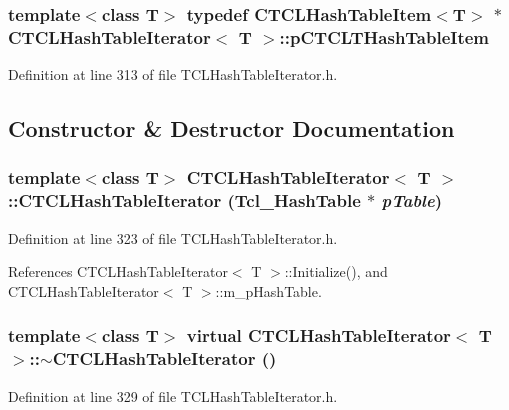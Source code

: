 \subsubsection{\setlength{\rightskip}{0pt plus 5cm}template$<$class T$>$ typedef {\bf CTCLHash\-Table\-Item}$<$T$>$ $\ast$ CTCLHash\-Table\-Iterator$<$ T $>$::p\-CTCLTHash\-Table\-Item\hspace{0.3cm}{\tt  [private]}}\label{classCTCLHashTableIterator_u1}




Definition at line 313 of file TCLHash\-Table\-Iterator.h.

\subsection{Constructor \& Destructor Documentation}
\subsubsection{\setlength{\rightskip}{0pt plus 5cm}template$<$class T$>$ CTCLHash\-Table\-Iterator$<$ T $>$::CTCLHash\-Table\-Iterator (Tcl\_\-Hash\-Table $\ast$ {\em p\-Table})\hspace{0.3cm}{\tt  [inline]}}\label{classCTCLHashTableIterator_a0}




Definition at line 323 of file TCLHash\-Table\-Iterator.h.

References CTCLHash\-Table\-Iterator$<$ T $>$::Initialize(), and CTCLHash\-Table\-Iterator$<$ T $>$::m\_\-p\-Hash\-Table.
\subsubsection{\setlength{\rightskip}{0pt plus 5cm}template$<$class T$>$ virtual CTCLHash\-Table\-Iterator$<$ T $>$::$\sim$CTCLHash\-Table\-Iterator ()\hspace{0.3cm}{\tt  [inline, virtual]}}\label{classCTCLHashTableIterator_a1}




Definition at line 329 of file TCLHash\-Table\-Iterator.h.
